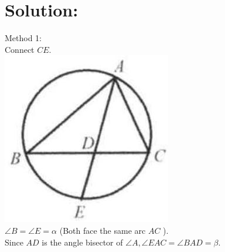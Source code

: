 \documentclass[10pt]{article}
\begin{document}
\section*{Solution:}
Method 1:\\
Connect \(C E\).\\
\includegraphics[max width=\textwidth, center]{2025_04_17_97bc1f7e44d93c271a88g-165(1)}\\
\(\angle B=\angle E=\alpha\) (Both face the same arc \(A C\) ).\\
Since \(A D\) is the angle bisector of \(\angle A, \angle E A C=\angle B A D=\beta\).
\end{document}
